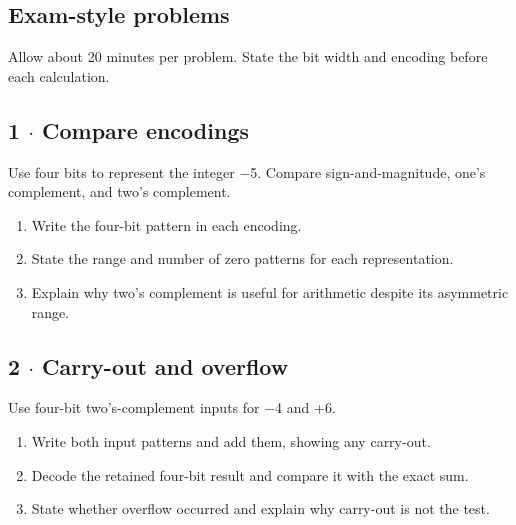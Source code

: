 \documentclass[11pt]{article}
\begin{document}
\begin{keepsection}
\section{Exam-style problems}

Allow about 20 minutes per problem. State the bit width and encoding before each calculation.

\begin{keepsection}
\subsection{1 \ensuremath{\cdot} Compare encodings}

Use four bits to represent the integer \ensuremath{-}5. Compare sign-and-magnitude, one’s complement, and two’s complement.

\begin{enumerate}
\item Write the four-bit pattern in each encoding.
\item State the range and number of zero patterns for each representation.
\item Explain why two’s complement is useful for arithmetic despite its asymmetric range.
\end{enumerate}

\end{keepsection}

\begin{keepsection}
\subsection{2 \ensuremath{\cdot} Carry-out and overflow}

Use four-bit two’s-complement inputs for \ensuremath{-}4 and +6.

\begin{enumerate}
\item Write both input patterns and add them, showing any carry-out.
\item Decode the retained four-bit result and compare it with the exact sum.
\item State whether overflow occurred and explain why carry-out is not the test.
\end{enumerate}


\end{keepsection}
\end{keepsection}
\end{document}
